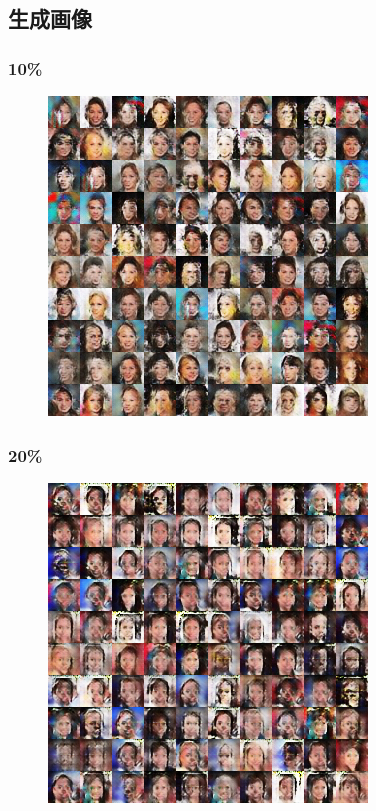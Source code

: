 \documentclass[dvipdfmx,12pt]{beamer}
\begin{document}
\subsection{生成画像}
\begin{frame}
	\frametitle{10\%}
	\begin{figure}[htbp]
	\begin{center}
	\includegraphics[width=0.7\hsize]{./dcgan/image00010000.png}
	\end{center}
	\end{figure}
\end{frame}
\begin{frame}
	\frametitle{20\%}
	\begin{figure}[htbp]
	\begin{center}
	\includegraphics[width=0.7\hsize]{./dcgan/image00020000.png}
	\end{center}
	\end{figure}
\end{frame}
\end{document}
